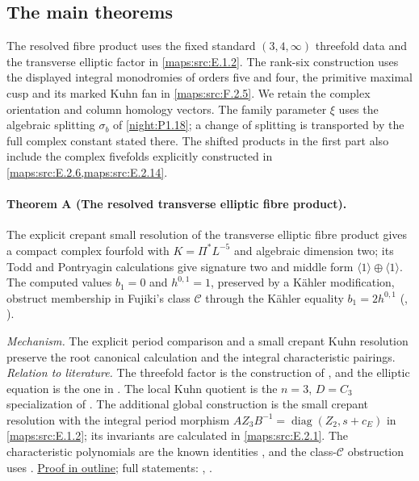 \subsection{The main theorems}
\label{series:V:main-theorems}

The resolved fibre product uses the fixed standard
$(3,4,\infty)$ threefold data and the transverse elliptic factor in
\cref{maps:src:E.1.2}. The rank-six construction uses the displayed
integral monodromies of orders five and four, the primitive maximal
cusp and its marked Kuhn fan in \cref{maps:src:F.2.5}. We retain the
complex orientation and column homology vectors. The family parameter
$\xi$ uses the algebraic splitting $\sigma_b$ of
\cref{night:P1.18}; a change of splitting is transported by the full
complex constant stated there. The shifted products in the first part
also include the complex fivefolds explicitly constructed in
\cref{maps:src:E.2.6,maps:src:E.2.14}.

\hypertarget{main-V-A}{}
\paragraph{Theorem A (The resolved transverse elliptic fibre product).}
\label{series:V:A}
The explicit crepant small resolution of the transverse elliptic
fibre product gives a compact complex fourfold with
$K=\Pi^*L^{-5}$ and algebraic dimension two; its Todd and
Pontryagin calculations give signature two and middle form
$\langle1\rangle\oplus\langle1\rangle$.
The computed values $b_1=0$ and $h^{0,1}=1$, preserved by a
K\"ahler modification, obstruct membership in Fujiki's class
$\mathcal C$ through the K\"ahler equality $b_1=2h^{0,1}$
(, ).

\textit{Mechanism.} The explicit period comparison and a small crepant Kuhn resolution preserve the root canonical calculation and the integral characteristic pairings.
\textit{Relation to literature.}
The threefold factor is the construction of
\cite[Theorems~7.17 and 7.22, pp.~57 and 60]{AC26}, and the
elliptic equation is the one in \cite[\S2, initial construction]{E26}.
The local Kuhn quotient is the $n=3$, $D=C_3$ specialization of
\cite[Theorem~8.7 and Corollary~8.8, attached-source edition, pp.~57--59]{Yang2026}.
The additional global construction is the small crepant resolution
with the integral period morphism
$AZ_3B^{-1}=\operatorname{diag}(Z_2,s+c_E)$ in
\cref{maps:src:E.1.2}; its invariants are calculated in
\cref{maps:src:E.2.1}.  The characteristic polynomials are the
known identities \cite[equations~(1.2)--(1.4), pp.~3--4]{ffEsoleKang},
and the class-$\mathcal C$ obstruction uses
\cite[Theorem~1.1 and Remark~1.2, p.~2]{ffJiaMeng}.
\hyperlink{outline-V-A}{Proof in outline}; full statements: , .

